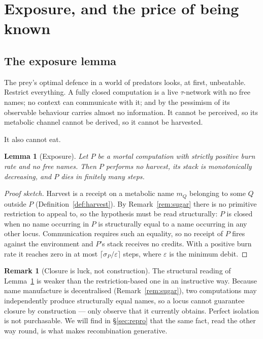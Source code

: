 \documentclass[11pt]{article}
\theoremstyle{plain}
\newtheorem{lemma}[theorem]{Lemma}
\theoremstyle{definition}
\newtheorem{remark}[theorem]{Remark}
\begin{document}
\section{Exposure, and the price of being known}
\label{sec:exposure}

\subsection{The exposure lemma}

The prey's optimal defence in a world of predators looks, at first, unbeatable. Restrict everything.
A fully closed computation is a live $\tau$-network with no free names; no context can communicate
with it; and by the pessimism of \cite[\S1]{ClassifierNote} its observable behaviour carries almost no
information. It cannot be perceived, so its metabolic channel cannot be derived, so it cannot be
harvested.

It also cannot eat.

\begin{lemma}[Exposure]
\label{lem:exposure}
Let $P$ be a mortal computation with strictly positive burn rate and no free names. Then $P$ performs
no harvest, its stack is monotonically decreasing, and $P$ dies in finitely many steps.
\end{lemma}

\begin{proof}[Proof sketch]
Harvest is a receipt on a metabolic name $m_Q$ belonging to some $Q$ outside $P$
(Definition~\ref{def:harvest}). By Remark~\ref{rem:sugar} there is no primitive restriction to appeal
to, so the hypothesis must be read structurally: $P$ is closed when no name occurring in $P$ is
structurally equal to a name occurring in any other locus. Communication requires such an equality, so
no receipt of $P$ fires against the environment and $P$'s stack receives no credits. With a positive
burn rate it reaches zero in at most $\lceil \sigma_P / \varepsilon \rceil$ steps, where $\varepsilon$
is the minimum debit.
\end{proof}

\begin{remark}[Closure is luck, not construction]
\label{rem:luck}
The structural reading of Lemma~\ref{lem:exposure} is weaker than the restriction-based one in an
instructive way. Because name manufacture is decentralised (Remark~\ref{rem:sugar}), two computations
may independently produce structurally equal names, so a locus cannot guarantee closure by
construction --- only observe that it currently obtains. Perfect isolation is not purchasable. We will
find in \S\ref{sec:repro} that the same fact, read the other way round, is what makes recombination
generative.
\end{remark}
\end{document}
